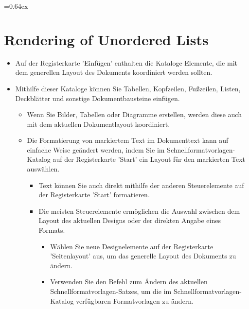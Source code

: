 \documentclass[11pt,a4paper]{article}
\def\hyph{-\penalty0\hskip0pt\relax} %
\begin{document}
\setlength{\baselineskip}{17pt}
\font=0.64ex%

\section{\XeTeX{} Rendering of Unordered Lists}
\begin{itemize}
	\item Auf der Registerkarte 'Einfügen' enthalten die Kataloge Elemente, die mit dem generellen Layout des Dokuments koordiniert werden sollten.
	\item Mithilfe dieser Kataloge können Sie Tabellen, Kopfzeilen, Fußzeilen, Listen, Deckblätter und sonstige Dokumentbausteine einfügen.
	\begin{itemize}
		\item Wenn Sie Bilder, Tabellen oder Diagramme erstellen, werden diese auch mit dem aktuellen Dokumentlayout koordiniert.
		\item Die Formatierung von markiertem Text im Dokumenttext kann auf einfache Weise geändert werden, indem Sie im Schnellformatvorlagen-Katalog auf der Registerkarte 'Start' ein Layout für den markierten Text auswählen.
		\begin{itemize}
			\item Text können Sie auch direkt mithilfe der anderen Steuerelemente auf der Registerkarte 'Start' formatieren.
			\item Die meisten Steuerelemente ermöglichen die Auswahl zwischen dem Layout des aktuellen Designs oder der direkten Angabe eines Formats.
			\begin{itemize}
				\item Wählen Sie neue Designelemente auf der Registerkarte 'Seitenlayout' aus, um das generelle Layout des Dokuments zu ändern.
				\item Verwenden Sie den Befehl zum Ändern des aktuellen Schnellformatvorlagen-Satzes, um die im Schnellformatvorlagen\hyph{}Katalog verfügbaren Formatvorlagen zu ändern.
			\end{itemize}
		\end{itemize}
	\end{itemize}
\end{itemize}
\end{document}
